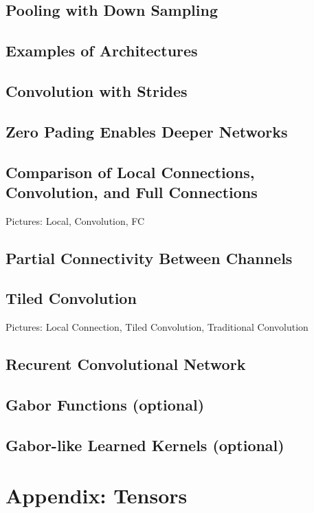 \documentclass[]{article}
\begin{document}
\subsection{Pooling with Down Sampling}

\subsection{Examples of Architectures}

\subsection{Convolution with Strides}

\subsection{Zero Pading Enables Deeper Networks}

\subsection{Comparison of Local Connections, Convolution, and Full Connections}
Pictures: Local, Convolution, FC

\subsection{Partial Connectivity Between Channels}

\subsection{Tiled Convolution}
Pictures: Local Connection, Tiled Convolution, Traditional Convolution

\subsection{Recurent Convolutional Network}

\subsection{Gabor Functions (optional)}

\subsection{Gabor-like Learned Kernels (optional)}

\section{Appendix: Tensors}
\end{document}
